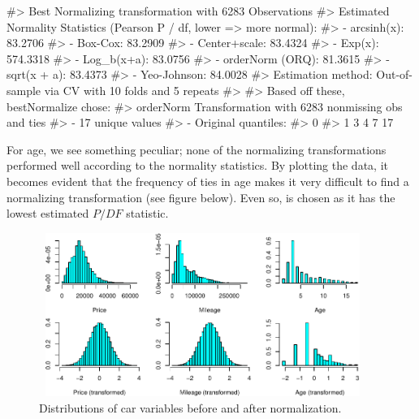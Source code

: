 \begin{Schunk}

\begin{Soutput}
#> Best Normalizing transformation with 6283 Observations
#>  Estimated Normality Statistics (Pearson P / df, lower => more normal):
#>  - arcsinh(x): 83.2706
#>  - Box-Cox: 83.2909
#>  - Center+scale: 83.4324
#>  - Exp(x): 574.3318
#>  - Log_b(x+a): 83.0756
#>  - orderNorm (ORQ): 81.3615
#>  - sqrt(x + a): 83.4373
#>  - Yeo-Johnson: 84.0028
#> Estimation method: Out-of-sample via CV with 10 folds and 5 repeats
#>  
#> Based off these, bestNormalize chose:
#> orderNorm Transformation with 6283 nonmissing obs and ties
#>  - 17 unique values 
#>  - Original quantiles:
#>   0%
#>    1    3    4    7   17
\end{Soutput}
\end{Schunk}

For age, we see something peculiar; none of the normalizing
transformations performed well according to the normality statistics. By
plotting the data, it becomes evident that the frequency of ties in age
makes it very difficult to find a normalizing transformation (see figure
below). Even so,  is chosen as it has the lowest
estimated \(P/DF\) statistic.

\begin{Schunk}
\begin{figure}

{\centering \includegraphics[width=4.2in,height=2.1in]{figs/hist_app-1} 

}

\caption[Distributions of car variables before and after normalization]{Distributions of car variables before and after normalization.}\label{fig:hist_app}
\end{figure}
\end{Schunk}

